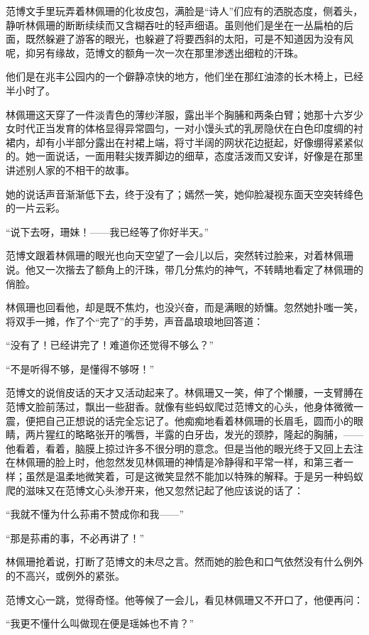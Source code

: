 \par 范博文手里玩弄着林佩珊的化妆皮包，满脸是“诗人”们应有的洒脱态度，侧着头，静听林佩珊的断断续续而又含糊吞吐的轻声细语。虽则他们是坐在一丛扁柏的后面，既然躲避了游客的眼光，也躲避了将要西斜的太阳，可是不知道因为没有风呢，抑另有缘故，范博文的额角一次一次在那里渗透出细粒的汗珠。
\par 他们是在兆丰公园内的一个僻静凉快的地方，他们坐在那红油漆的长木椅上，已经半小时了。
\par 林佩珊这天穿了一件淡青色的薄纱洋服，露出半个胸脯和两条白臂；她那十六岁少女时代正当发育的体格显得异常圆匀，一对小馒头式的乳房隐伏在白色印度绸的衬裙内，却有小半部分露出在衬裙上端，将寸半阔的网状花边挺起，好像绷得紧紧似的。她一面说话，一面用鞋尖拨弄脚边的细草，态度活泼而又安详，好像是在那里讲述别人家的不相干的故事。
\par 她的说话声音渐渐低下去，终于没有了；嫣然一笑，她仰脸凝视东面天空突转绛色的一片云彩。
\par “说下去呀，珊妹！——我已经等了你好半天。”
\par 范博文跟着林佩珊的眼光也向天空望了一会儿以后，突然转过脸来，对着林佩珊说。他又一次揩去了额角上的汗珠，带几分焦灼的神气，不转睛地看定了林佩珊的俏脸。
\par 林佩珊也回看他，却是既不焦灼，也没兴奋，而是满眼的娇慵。忽然她扑嗤一笑，将双手一摊，作了个“完了”的手势，声音晶琅琅地回答道：
\par “没有了！已经讲完了！难道你还觉得不够么？”
\par “不是听得不够，是懂得不够呀！”
\par 范博文的说俏皮话的天才又活动起来了。林佩珊又一笑，伸了个懒腰，一支臂膊在范博文脸前荡过，飘出一些甜香。就像有些蚂蚁爬过范博文的心头，他身体微微一震，便把自己正想说的话完全忘记了。他痴痴地看着林佩珊的长眉毛，圆而小的眼睛，两片猩红的略略张开的嘴唇，半露的白牙齿，发光的颈脖，隆起的胸脯，——他看着，看着，脑膜上掠过许多不很分明的意念。但是当他的眼光终于又回上去注在林佩珊的脸上时，他忽然发见林佩珊的神情是冷静得和平常一样，和第三者一样；虽然是温柔地微笑着，可是这微笑显然不能加以特殊的解释。于是另一种蚂蚁爬的滋味又在范博文心头渗开来，他又忽然记起了他应该说的话了：
\par “我就不懂为什么荪甫不赞成你和我——”
\par “那是荪甫的事，不必再讲了！”
\par 林佩珊抢着说，打断了范博文的未尽之言。然而她的脸色和口气依然没有什么例外的不高兴，或例外的紧张。
\par 范博文心一跳，觉得奇怪。他等候了一会儿，看见林佩珊又不开口了，他便再问：
\par “我更不懂什么叫做现在便是瑶姊也不肯？”
